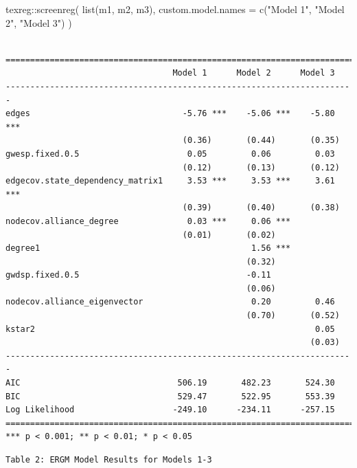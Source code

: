 \documentclass[
]{article}
\newenvironment{Shaded}{\begin{snugshade}}{\end{snugshade}}
\newcommand{\AttributeTok}[1]{\textcolor[rgb]{0.40,0.45,0.13}{#1}}
\newcommand{\FunctionTok}[1]{\textcolor[rgb]{0.28,0.35,0.67}{#1}}
\newcommand{\NormalTok}[1]{\textcolor[rgb]{0.00,0.23,0.31}{#1}}
\newcommand{\SpecialCharTok}[1]{\textcolor[rgb]{0.37,0.37,0.37}{#1}}
\newcommand{\StringTok}[1]{\textcolor[rgb]{0.13,0.47,0.30}{#1}}
\begin{document}
\pagebreak

\begin{Shaded}
\begin{Highlighting}[]
\NormalTok{texreg}\SpecialCharTok{::}\FunctionTok{screenreg}\NormalTok{(}
  \FunctionTok{list}\NormalTok{(m1, m2, m3),}
  \AttributeTok{custom.model.names =} \FunctionTok{c}\NormalTok{(}\StringTok{"Model 1"}\NormalTok{, }\StringTok{"Model 2"}\NormalTok{, }\StringTok{"Model 3"}\NormalTok{)}
\NormalTok{)}
\end{Highlighting}
\end{Shaded}

\begin{verbatim}

=======================================================================
                                  Model 1      Model 2      Model 3    
-----------------------------------------------------------------------
edges                               -5.76 ***    -5.06 ***    -5.80 ***
                                    (0.36)       (0.44)       (0.35)   
gwesp.fixed.0.5                      0.05         0.06         0.03    
                                    (0.12)       (0.13)       (0.12)   
edgecov.state_dependency_matrix1     3.53 ***     3.53 ***     3.61 ***
                                    (0.39)       (0.40)       (0.38)   
nodecov.alliance_degree              0.03 ***     0.06 ***             
                                    (0.01)       (0.02)                
degree1                                           1.56 ***             
                                                 (0.32)                
gwdsp.fixed.0.5                                  -0.11                 
                                                 (0.06)                
nodecov.alliance_eigenvector                      0.20         0.46    
                                                 (0.70)       (0.52)   
kstar2                                                         0.05    
                                                              (0.03)   
-----------------------------------------------------------------------
AIC                                506.19       482.23       524.30    
BIC                                529.47       522.95       553.39    
Log Likelihood                    -249.10      -234.11      -257.15    
=======================================================================
*** p < 0.001; ** p < 0.01; * p < 0.05
\end{verbatim}

\begin{verbatim}
Table 2: ERGM Model Results for Models 1-3
\end{verbatim}
\end{document}
